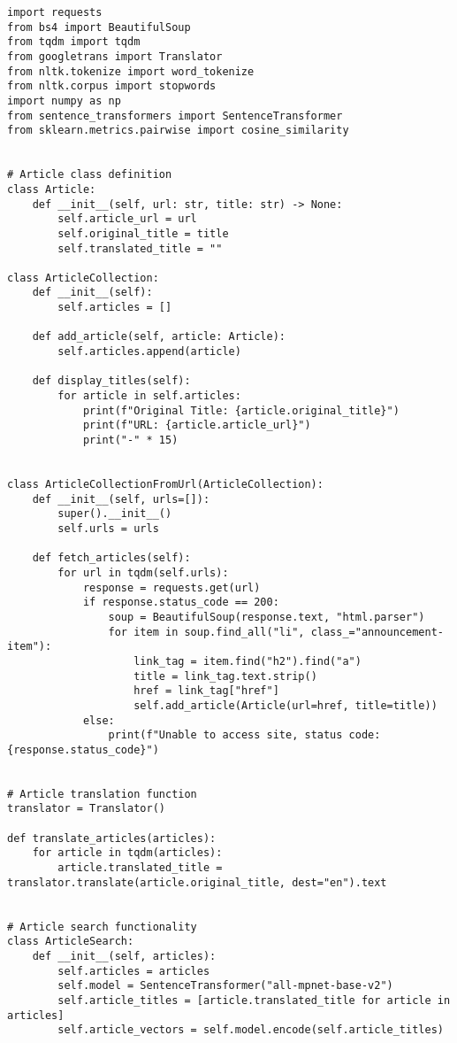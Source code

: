 \small
\begin{lstlisting}
import requests
from bs4 import BeautifulSoup
from tqdm import tqdm
from googletrans import Translator
from nltk.tokenize import word_tokenize
from nltk.corpus import stopwords
import numpy as np
from sentence_transformers import SentenceTransformer
from sklearn.metrics.pairwise import cosine_similarity


# Article class definition
class Article:
    def __init__(self, url: str, title: str) -> None:
        self.article_url = url
        self.original_title = title
        self.translated_title = ""

class ArticleCollection:
    def __init__(self):
        self.articles = []

    def add_article(self, article: Article):
        self.articles.append(article)

    def display_titles(self):
        for article in self.articles:
            print(f"Original Title: {article.original_title}")
            print(f"URL: {article.article_url}")
            print("-" * 15)


class ArticleCollectionFromUrl(ArticleCollection):
    def __init__(self, urls=[]):
        super().__init__()
        self.urls = urls

    def fetch_articles(self):
        for url in tqdm(self.urls):
            response = requests.get(url)
            if response.status_code == 200:
                soup = BeautifulSoup(response.text, "html.parser")
                for item in soup.find_all("li", class_="announcement-item"):
                    link_tag = item.find("h2").find("a")
                    title = link_tag.text.strip()
                    href = link_tag["href"]
                    self.add_article(Article(url=href, title=title))
            else:
                print(f"Unable to access site, status code: {response.status_code}")


# Article translation function
translator = Translator()

def translate_articles(articles):
    for article in tqdm(articles):
        article.translated_title = translator.translate(article.original_title, dest="en").text


# Article search functionality
class ArticleSearch:
    def __init__(self, articles):
        self.articles = articles
        self.model = SentenceTransformer("all-mpnet-base-v2")
        self.article_titles = [article.translated_title for article in articles]
        self.article_vectors = self.model.encode(self.article_titles)


\end{lstlisting}
